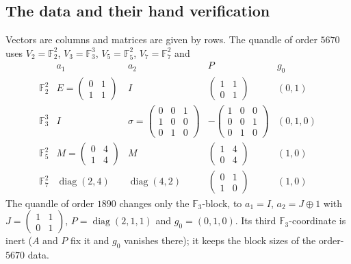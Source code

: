 \documentclass[11pt]{article}
\newcommand{\F}{\mathbb{F}}
\begin{document}
\begin{appendices}
\section{The data and their hand verification}\label{app:data}

Vectors are columns and matrices are given by rows. The quandle of order
$5670$ uses $V_2=\F_2^2$, $V_3=\F_3^3$, $V_5=\F_5^2$, $V_7=\F_7^2$ and
\[
\begin{array}{c|cccc}
 & a_1 & a_2 & P & g_0\\\hline
\F_2^2 & E=\begin{pmatrix}0&1\\1&1\end{pmatrix} & I & \begin{pmatrix}1&1\\0&1\end{pmatrix} & (0,1)\\[8pt]
\F_3^3 & I & \sigma=\begin{pmatrix}0&0&1\\1&0&0\\0&1&0\end{pmatrix} & -\begin{pmatrix}1&0&0\\0&0&1\\0&1&0\end{pmatrix} & (0,1,0)\\[12pt]
\F_5^2 & M=\begin{pmatrix}0&4\\1&4\end{pmatrix} & M & \begin{pmatrix}1&4\\0&4\end{pmatrix} & (1,0)\\[8pt]
\F_7^2 & \operatorname{diag}(2,4) & \operatorname{diag}(4,2) & \begin{pmatrix}0&1\\1&0\end{pmatrix} & (1,0)
\end{array}
\]
The quandle of order $1890$ changes only the $\F_3$-block, to $a_1=I$,
$a_2=J\oplus1$ with $J=\left(\begin{smallmatrix}1&1\\0&1\end{smallmatrix}\right)$,
$P=\operatorname{diag}(2,1,1)$ and $g_0=(0,1,0)$. Its third $\F_3$-coordinate
is inert ($A$ and $P$ fix it and $g_0$ vanishes there); it keeps the block
sizes of the order-$5670$ data.


\end{appendices}
\end{document}
